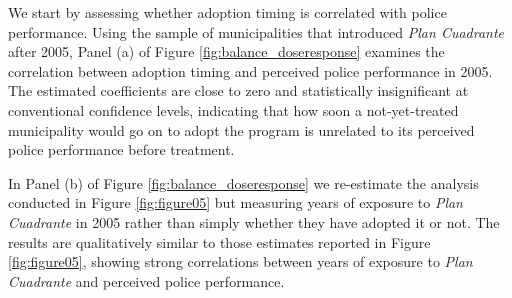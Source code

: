 We start by assessing whether adoption timing is correlated with police performance. Using the sample of municipalities that introduced \emph{Plan Cuadrante} after 2005, Panel (a) of Figure \ref{fig:balance_doseresponse} examines the correlation between adoption timing and perceived police performance in 2005. The estimated coefficients are close to zero and statistically insignificant at conventional confidence levels, indicating that how soon a not-yet-treated municipality would go on to adopt the program is unrelated to its perceived police performance before treatment.

In Panel (b) of Figure \ref{fig:balance_doseresponse} we re-estimate the analysis conducted in Figure \ref{fig:figure05} but measuring years of exposure to \emph{Plan Cuadrante} in 2005 rather than simply whether they have adopted it or not. The results are qualitatively similar to those estimates reported in Figure \ref{fig:figure05}, showing strong correlations between years of exposure to \emph{Plan Cuadrante} and perceived police performance.


\clearpage